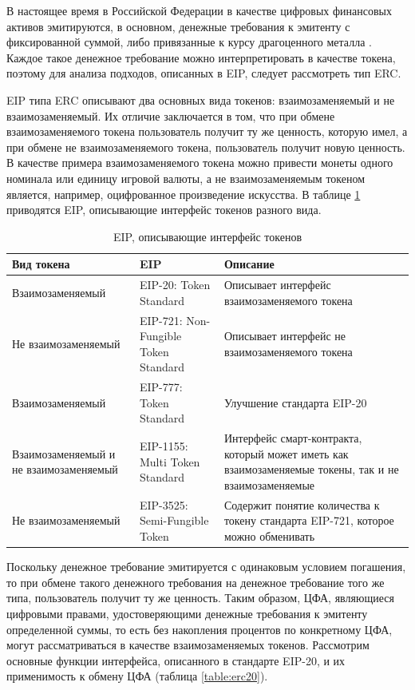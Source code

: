 \documentclass[a4paper, 10pt]{article}
\begin{document}
	В настоящее время в Российской Федерации в качестве цифровых финансовых активов эмитируются, в основном, денежные требования к эмитенту с фиксированной суммой, либо привязанные к курсу драгоценного металла \cite{ru:dfa, ru:lighthouse}. Каждое такое денежное требование можно интерпретировать в качестве токена, поэтому для анализа подходов, описанных в EIP, следует рассмотреть тип ERC. 
	
	EIP типа ERC описывают два основных вида токенов: взаимозаменяемый и не взаимозаменяемый. Их отличие заключается в том, что при обмене взаимозаменяемого токена пользователь получит ту же ценность, которую имел, а при обмене не взаимозаменяемого токена, пользователь получит новую ценность. В качестве примера взаимозаменяемого токена можно привести монеты одного номинала или единицу игровой валюты, а не взаимозаменяемым токеном является, например, оцифрованное произведение искусства. В таблице \ref{table:eip} приводятся EIP, описывающие интерфейс токенов разного вида.
	
	\begin{longtable}{|p{3.5cm}|p{6.1cm}|p{6.2cm}|}
		\caption{EIP, описывающие интерфейс токенов}
		\label{table:eip}\\
		\hline
		
		\textbf{Вид токена} 
		& \textbf{EIP} 
		& \textbf{Описание}\\
		\hline
		
		Взаимозаменяемый
		& EIP-20: Token Standard
		& Описывает интерфейс взаимозаменяемого токена\\
		\hline
		
		Не взаимозаменяемый
		& EIP-721: Non-Fungible Token Standard
		& Описывает интерфейс не взаимозаменяемого токена\\
		\hline
		
		Взаимозаменяемый
		& EIP-777: Token Standard
		& Улучшение стандарта EIP-20\\
		\hline
		
		Взаимозаменяемый и не взаимозаменяемый
		& EIP-1155: Multi Token Standard
		& Интерфейс смарт-контракта, который может иметь как взаимозаменяемые токены, так и не взаимозаменяемые\\
		\hline
		
		Не взаимозаменяемый
		& EIP-3525: Semi-Fungible Token
		& Содержит понятие количества к токену стандарта EIP-721, которое можно обменивать\\
		\hline
	\end{longtable}
	
	Поскольку денежное требование эмитируется с одинаковым условием погашения, то при обмене такого денежного требования на денежное требование того же типа, пользователь получит ту же ценность. Таким образом, ЦФА, являющиеся цифровыми правами, удостоверяющими денежные требования к эмитенту определенной суммы, то есть без накопления процентов по конкретному ЦФА, могут рассматриваться в качестве взаимозаменяемых токенов.
	Рассмотрим основные функции интерфейса, описанного в стандарте EIP-20, и их применимость к обмену ЦФА (таблица \ref{table:erc20}).
	
\end{document}
